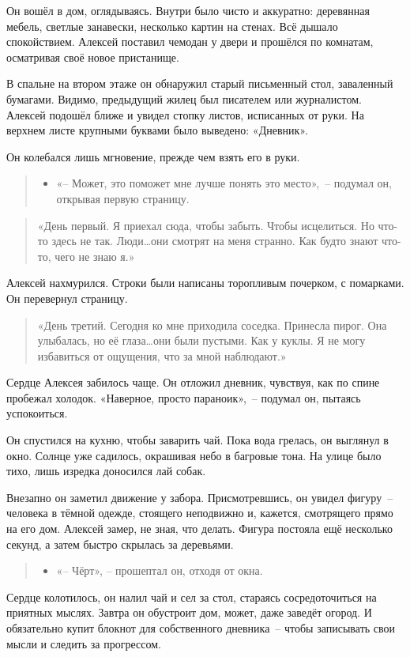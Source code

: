 \documentclass[12pt,a4paper]{book}
\newenvironment{dialogue}{\begin{quote}\itshape\begin{itemize}\item[]}{\end{itemize}\end{quote}}
\begin{document}
Он вошёл в дом, оглядываясь. Внутри было чисто и аккуратно: деревянная мебель, светлые занавески, несколько картин на стенах. Всё дышало спокойствием. Алексей поставил чемодан у двери и прошёлся по комнатам, осматривая своё новое пристанище.

В спальне на втором этаже он обнаружил старый письменный стол, заваленный бумагами. Видимо, предыдущий жилец был писателем или журналистом. Алексей подошёл ближе и увидел стопку листов, исписанных от руки. На верхнем листе крупными буквами было выведено: «Дневник».

Он колебался лишь мгновение, прежде чем взять его в руки.
\begin{dialogue}
«-- Может, это поможет мне лучше понять это место»,~-- подумал он, открывая первую страницу.
\end{dialogue}

\begin{quote}
«День первый. Я приехал сюда, чтобы забыть. Чтобы исцелиться. Но что-то здесь не так. Люди\ldots они смотрят на меня странно. Как будто знают что-то, чего не знаю я.»
\end{quote}

Алексей нахмурился. Строки были написаны торопливым почерком, с помарками. Он перевернул страницу.
\begin{quote}
«День третий. Сегодня ко мне приходила соседка. Принесла пирог. Она улыбалась, но её глаза\ldots они были пустыми. Как у куклы. Я не могу избавиться от ощущения, что за мной наблюдают.»
\end{quote}

Сердце Алексея забилось чаще. Он отложил дневник, чувствуя, как по спине пробежал холодок. «Наверное, просто параноик»,~-- подумал он, пытаясь успокоиться.

Он спустился на кухню, чтобы заварить чай. Пока вода грелась, он выглянул в окно. Солнце уже садилось, окрашивая небо в багровые тона. На улице было тихо, лишь изредка доносился лай собак.

Внезапно он заметил движение у забора. Присмотревшись, он увидел фигуру~-- человека в тёмной одежде, стоящего неподвижно и, кажется, смотрящего прямо на его дом. Алексей замер, не зная, что делать. Фигура постояла ещё несколько секунд, а затем быстро скрылась за деревьями.

\begin{dialogue}
    «-- Чёрт», -- прошептал он, отходя от окна.
\end{dialogue}

Сердце колотилось, он налил чай и сел за стол, стараясь сосредоточиться на приятных мыслях. Завтра он обустроит дом, может, даже заведёт огород. И обязательно купит блокнот для собственного дневника~-- чтобы записывать свои мысли и следить за прогрессом.
\end{document}
